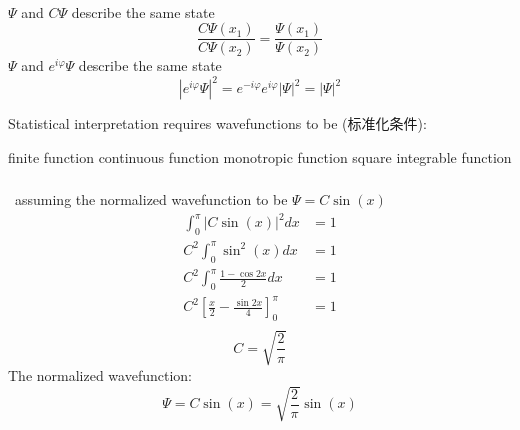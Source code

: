 \begin{frame}
    \frametitle{}
    \Tips \\
    \begin{itemize}
        \Item $\Psi$ and $C\Psi$ describe the same state 
        \[ \frac{C\Psi(x_1)}{C\Psi(x_2)} = \frac{\Psi(x_1)}{\Psi(x_2)}\]
        \Item $\Psi$ and $e^{i\varphi}\Psi$ describe the same state 
         \[ |e^{i\varphi}\Psi|^2 = e^{-i\varphi} e^{i\varphi} |\Psi|^2 = |\Psi|^2 \] 
    \end{itemize}  
\end{frame}

\begin{frame}
    Statistical interpretation requires wavefunctions to be (标准化条件):
    \begin{itemize}
        \Item finite  function
        \Item continuous function 
        \Item monotropic function
        \Item square integrable function 
    \end{itemize}
\end{frame}

\begin{frame}[allowframebreaks=]
    \frametitle{}
    \Solution ~assuming the normalized wavefunction to be 
    $\Psi=C\sin(x)$
    \begin{equation*}
        \begin{split}
            \int_0 ^\pi |C\sin(x)|^2 dx &=1 \\
            C^2 \int_0 ^\pi \sin^2(x) dx &=1 \\
            C^2 \int_0 ^\pi \frac{1-\cos 2x }{2} dx &=1 \\ 
            C^2 [\frac{x}{2}-\frac{\sin 2x}{4}]_0 ^\pi &=1 \\ 
        \end{split} 
     \end{equation*}
     \[C=\sqrt{\frac{2}{\pi}}\]
     The normalized wavefunction:
     \begin{equation*}
        \Psi=C\sin(x)=\sqrt{\frac{2}{\pi}}\sin(x)
    \end{equation*}
\end{frame}

